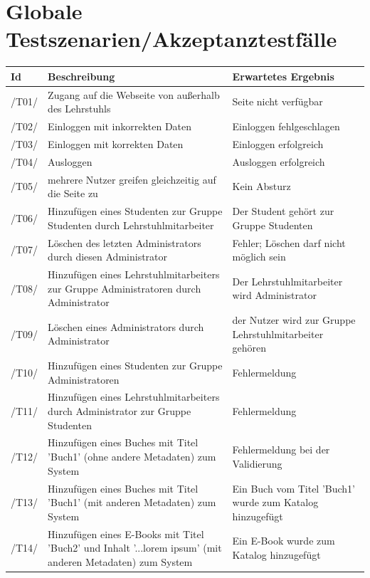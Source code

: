 \documentclass[12pt, a4paper]{article}
\begin{document}
\pagebreak

\section{Globale Testszenarien/Akzeptanztestfälle}
\begin{table}[H]
	\begin{tabular}{p{1.2cm}|p{6.5cm}|p{5.5cm}}
		\textbf{Id} & \textbf{Beschreibung} & \textbf{Erwartetes Ergebnis}\\
		\hline
		/T01/ & Zugang auf die Webseite von außerhalb des Lehrstuhls & Seite nicht verfügbar\\
		\hline
		/T02/ & Einloggen mit inkorrekten Daten & Einloggen fehlgeschlagen\\
		\hline
		/T03/ & Einloggen mit korrekten Daten & Einloggen erfolgreich\\
		\hline
		/T04/ & Ausloggen & Ausloggen erfolgreich\\
		\hline
		/T05/ & mehrere Nutzer greifen gleichzeitig auf die Seite zu & Kein Absturz\\
		\hline
		/T06/ & Hinzufügen eines Studenten zur Gruppe Studenten durch Lehrstuhlmitarbeiter & Der Student gehört zur Gruppe Studenten\\
		\hline
		/T07/ & Löschen des letzten Administrators durch diesen Administrator & Fehler; Löschen darf nicht möglich sein\\
		\hline
		/T08/ & Hinzufügen eines Lehrstuhlmitarbeiters zur Gruppe Administratoren durch Administrator & Der Lehrstuhlmitarbeiter wird Administrator\\
		\hline
		/T09/ & Löschen eines Administrators durch Administrator & der Nutzer wird zur Gruppe Lehrstuhlmitarbeiter gehören\\
		\hline
		/T10/ & Hinzufügen eines Studenten zur Gruppe Administratoren & Fehlermeldung\\
		/T11/ & Hinzufügen eines Lehrstuhlmitarbeiters durch Administrator zur Gruppe Studenten & Fehlermeldung\\
		\hline
		/T12/ & Hinzufügen eines Buches mit Titel  'Buch1'  (ohne andere Metadaten) zum System & Fehlermeldung bei der Validierung\\
		\hline
		/T13/ & Hinzufügen eines Buches mit Titel  'Buch1'  (mit anderen Metadaten) zum System & Ein Buch vom Titel  'Buch1'  wurde zum Katalog hinzugefügt\\
		\hline
		/T14/ & Hinzufügen eines E-Books mit Titel  'Buch2'  und Inhalt  '...lorem ipsum'  (mit anderen Metadaten) zum System & Ein E-Book wurde zum Katalog hinzugefügt\\
    \end{tabular}
\end{table}
\end{document}
